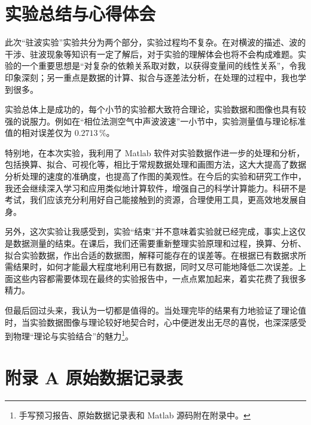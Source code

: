 \documentclass[UTF8]{article}
\theoremstyle{MyLineTheoremStyle} %
\theoremstyle{MyBlockTheoremStyle} %
\theoremstyle{MySubsubsectionStyle} %
\begin{document}
\section{实验总结与心得体会}
此次“驻波实验”实验共分为两个部分，实验过程均不复杂。在对横波的描述、波的干涉、驻波现象等知识有一定了解后，对于实验的理解体会也将不会构成难题。实验的一个重要思想是“对复杂的依赖关系取对数，以获得变量间的线性关系”，令我印象深刻；另一重点是数据的计算、拟合与逐差法分析，在处理的过程中，我也学到很多。

实验总体上是成功的，每个小节的实验都大致符合理论，实验数据和图像也具有较强的说服力。例如在“相位法测空气中声波波速”一小节中，实验测量值与理论标准值的相对误差仅为 $0.2713 \, \%$。

特别地，在本次实验，我利用了 Matlab 软件对实验数据作进一步的处理和分析，包括换算、拟合、可视化等，相比于常规数据处理和画图方法，这大大提高了数据分析处理的速度的准确度，也提高了作图的美观性。在今后的实验和研究工作中，我还会继续深入学习和应用类似地计算软件，增强自己的科学计算能力。科研不是考试，我们应该充分利用好自己能接触到的资源，合理使用工具，更高效地发展自身。

另外，这次实验让我感受到，实验“结束”并不意味着实验就已经完成，事实上这仅是数据测量的结束。在课后，我们还需要重新整理实验原理和过程，换算、分析、拟合实验数据，作出合适的数据图，解释可能存在的误差等。在根据已有数据求所需结果时，如何才能最大程度地利用已有数据，同时又尽可能地降低二次误差。上面这些内容都需要体现在最终的实验报告中，一点点累加起来，着实花费了我很多精力。

但最后回过头来，我认为一切都是值得的。当处理完毕的结果有力地验证了理论值时，当实验数据图像与理论较好地契合时，心中便迸发出无尽的喜悦，也深深感受到物理“理论与实验结合”的魅力\footnote{手写预习报告、原始数据记录表和 Matlab 源码附在附录中。}。

\newpage
\section*{附录 A\hspace*{20pt} 原始数据记录表}
\thispagestyle{fancy} 

\begin{figure}[H]\centering
    
\end{figure}

\end{document}
